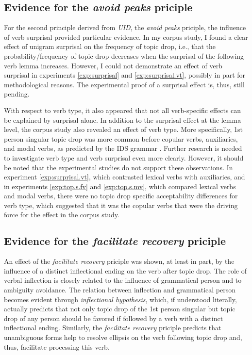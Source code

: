 \subsection{Evidence for the \textit{avoid peaks} priciple}
For the second principle derived from \textit{UID}, the \textit{avoid peaks} priciple, the influence of verb surprisal provided particular evidence.
In my corpus study,  I found a clear effect of unigram surprisal on the frequency of topic drop, i.e., that the probability/frequency of topic drop decreases when the surprisal of the following verb lemma increases.
However, I could not demonstrate an effect of verb surprisal in experiments \ref*{exp:surprisal} and \ref*{exp:surprisal.vt}, possibly in part for methodological reasons.
The experimental proof of a surprisal effect is, thus, still pending.

With respect to verb type, it also appeared that not all verb-specific effects can be explained by surprisal alone.
In addition to the surprisal effect at the lemma level, the corpus  study also revealed an effect of verb type.
More specifically, 1st person singular topic drop was more common before copular verbs, auxiliaries, and modal verbs, as predicted by the IDS grammar  \citep{zifonun.etal1997}.   
Further research is needed to investigate verb type and verb surprisal even more clearly.
However, it should be noted that the experimental studies do not support these observations.
In experiment \ref*{exp:surprisal.vt}, which contrasted lexical verbs  with auxiliaries,  and in experiments \ref*{exp:top.s.fv} and \ref*{exp:top.s.mv}, which compared lexical verbs  and modal verbs,  there were no topic drop specific acceptability differences for verb type, which suggested that it was the copular verbs  that were the driving force for the effect in the corpus  study.

\subsection{Evidence for the \textit{facilitate recovery} priciple}
 
An effect of the \textit{facilitate recovery} priciple was shown, at least in part, by the influence of a distinct inflectional ending on the verb after topic drop.
The role of verbal inflection is closely related to the influence of grammatical person and to ambiguity avoidance. 
The relation between inflection and grammatical person becomes evident through  \textit{inflectional hypothesis}, which, if understood literally, actually predicts that not only topic drop of the 1st person singular but topic drop of any person should be favored if followed by a verb with a distinct inflectional ending. 
Similarly, the \textit{facilitate recovery} priciple predicts that unambiguous forms help to resolve ellipsis on the verb following topic drop and, thus, facilitate processing this verb.   

